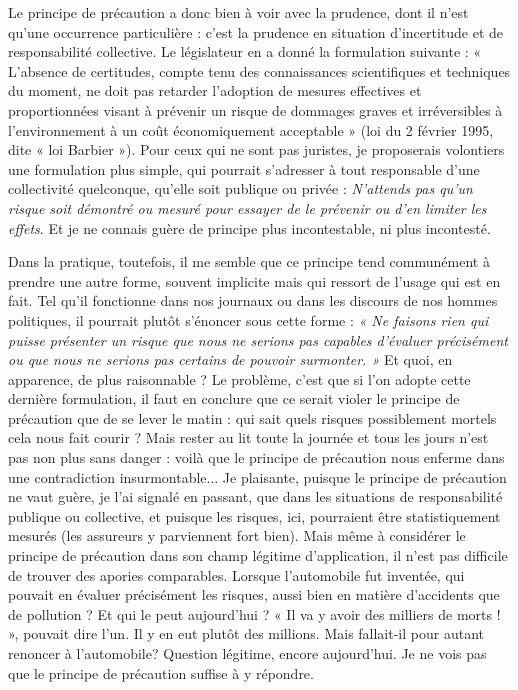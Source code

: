 Le principe de précaution a donc bien à voir avec la prudence, dont il n’est
qu’une occurrence particulière : c’est la prudence en situation d’incertitude et
de responsabilité collective. Le législateur en a donné la formulation suivante :
« L'absence de certitudes, compte tenu des connaissances scientifiques et techniques
du moment, ne doit pas retarder l’adoption de mesures effectives et proportionnées
visant à prévenir un risque de dommages graves et irréversibles à
l’environnement à un coût économiquement acceptable » (loi du 2 février
1995, dite « loi Barbier »). Pour ceux qui ne sont pas juristes, je proposerais
volontiers une formulation plus simple, qui pourrait s'adresser à tout responsable
d’une collectivité quelconque, qu’elle soit publique ou privée : {\it N'attends
pas qu'un risque soit démontré ou mesuré pour essayer de le prévenir ou d'en limiter
les effets}. Et je ne connais guère de principe plus incontestable, ni plus incontesté.

Dans la pratique, toutefois, il me semble que ce principe tend communément
à prendre une autre forme, souvent implicite mais qui ressort de l'usage
qui est en fait. Tel qu’il fonctionne dans nos journaux ou dans les discours de
nos hommes politiques, il pourrait plutôt s’énoncer sous cette forme : {\it « Ne faisons
rien qui puisse présenter un risque que nous ne serions pas capables d'évaluer
précisément ou que nous ne serions pas certains de pouvoir surmonter. »} Et quoi, en
apparence, de plus raisonnable ? Le problème, c’est que si l’on adopte cette dernière
formulation, il faut en conclure que ce serait violer le principe de précaution
que de se lever le matin : qui sait quels risques possiblement mortels cela
nous fait courir ? Mais rester au lit toute la journée et tous les jours n’est pas
non plus sans danger : voilà que le principe de précaution nous enferme dans
une contradiction insurmontable... Je plaisante, puisque le principe de précaution
ne vaut guère, je l’ai signalé en passant, que dans les situations de responsabilité
publique ou collective, et puisque les risques, ici, pourraient être statistiquement
mesurés (les assureurs y parviennent fort bien). Mais même à
considérer le principe de précaution dans son champ légitime d’application, il
n’est pas difficile de trouver des apories comparables. Lorsque l’automobile fut
inventée, qui pouvait en évaluer précisément les risques, aussi bien en matière
d’accidents que de pollution ? Et qui le peut aujourd’hui ? « Il va y avoir des
milliers de morts ! », pouvait dire l’un. Il y en eut plutôt des millions. Mais fallait-il
pour autant renoncer à l'automobile? Question légitime, encore
aujourd’hui. Je ne vois pas que le principe de précaution suffise à y répondre.

